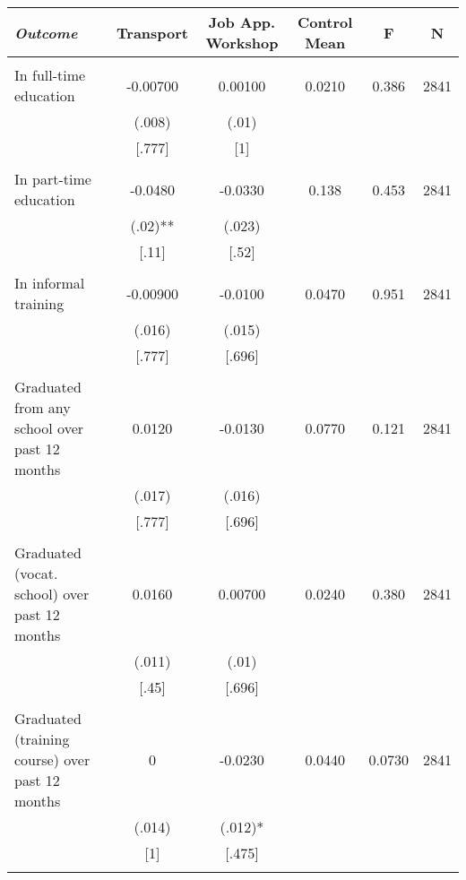 \begin{tabular}{lccccc} \hline
\multicolumn{1}{l}{\emph{Outcome}} & \multicolumn{1}{c}{Transport} &\multicolumn{1}{c}{Job App. Workshop} & \multicolumn{1}{c}{Control Mean} & \multicolumn{1}{c}{F} & \multicolumn{1}{c}{N} \\ \hline \\
In full-time education & -0.00700 & 0.00100 & 0.0210 & 0.386 & 2841 \\
& (.008) & (.01) &  &  &  \\
& [.777] & [1] &  &  &  \\
&  &  &  &  &  \\
In part-time education & -0.0480 & -0.0330 & 0.138 & 0.453 & 2841 \\
& (.02)** & (.023) &  &  &  \\
& [.11] & [.52] &  &  &  \\
&  &  &  &  &  \\
In informal training & -0.00900 & -0.0100 & 0.0470 & 0.951 & 2841 \\
& (.016) & (.015) &  &  &  \\
& [.777] & [.696] &  &  &  \\
&  &  &  &  &  \\
Graduated from any school over past 12 months & 0.0120 & -0.0130 & 0.0770 & 0.121 & 2841 \\
& (.017) & (.016) &  &  &  \\
& [.777] & [.696] &  &  &  \\
&  &  &  &  &  \\
Graduated (vocat. school) over past 12 months & 0.0160 & 0.00700 & 0.0240 & 0.380 & 2841 \\
& (.011) & (.01) &  &  &  \\
& [.45] & [.696] &  &  &  \\
&  &  &  &  &  \\
Graduated (training course) over past 12 months & 0 & -0.0230 & 0.0440 & 0.0730 & 2841 \\
& (.014) & (.012)* &  &  &  \\
& [1] & [.475] &  &  &  \\
&  &  &  &  &  \\ \hline
\end{tabular}
